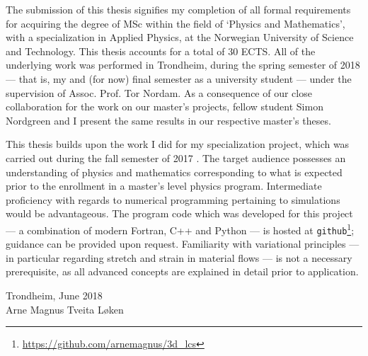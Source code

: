 The submission of this thesis signifies my completion of all formal
requirements for acquiring the degree of MSc within the field of `Physics and
Mathematics', with a specialization in Applied Physics, at the Norwegian
University of Science and Technology. This thesis accounts for a total of 30
ECTS. All of the underlying work was performed in Trondheim, during the spring
semester of 2018 --- that is, my  and (for now) final semester as a
university student --- under the supervision of Assoc. Prof. Tor Nordam. As a
consequence of our close collaboration for the work on our master's projects,
fellow student Simon Nordgreen and I present the same results in our respective
master's theses.

This thesis builds upon the work I did for my specialization project, which was
carried out during the fall semester of 2017 \parencite{loken2017sensitivity}.
The target audience possesses an understanding of physics and mathematics
corresponding to what is expected prior to the enrollment in a master's level
physics program. Intermediate proficiency with regards to numerical programming
pertaining to simulations would be advantageous. The program code which was
developed for this project --- a combination of modern Fortran, C++ and
Python --- is hosted at
\texttt{github}\footnote{\url{https://github.com/arnemagnus/3d_lcs}}; guidance
can be provided upon request. Familiarity with variational principles --- in
particular regarding stretch and strain in material flows --- is not a
necessary prerequisite, as all advanced concepts are explained in detail prior
to application.


\begin{minipage}[t]{\textwidth}
    \begin{flushright}
    Trondheim, June 2018\\
    Arne Magnus Tveita Løken
    \end{flushright}
\end{minipage}
